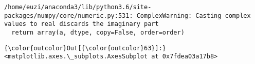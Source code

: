 \documentclass[11pt]{article}
\begin{document}
    \begin{Verbatim}[commandchars=\\\{\}]
/home/euzi/anaconda3/lib/python3.6/site-packages/numpy/core/numeric.py:531: ComplexWarning: Casting complex values to real discards the imaginary part
  return array(a, dtype, copy=False, order=order)

    \end{Verbatim}

\begin{Verbatim}[commandchars=\\\{\}]
{\color{outcolor}Out[{\color{outcolor}63}]:} <matplotlib.axes.\_subplots.AxesSubplot at 0x7fdea03a17b8>
\end{Verbatim}
            
    \begin{center}
    \end{center}
    { \hspace*{\fill} \\}
    

    
    
    
    
\end{document}
